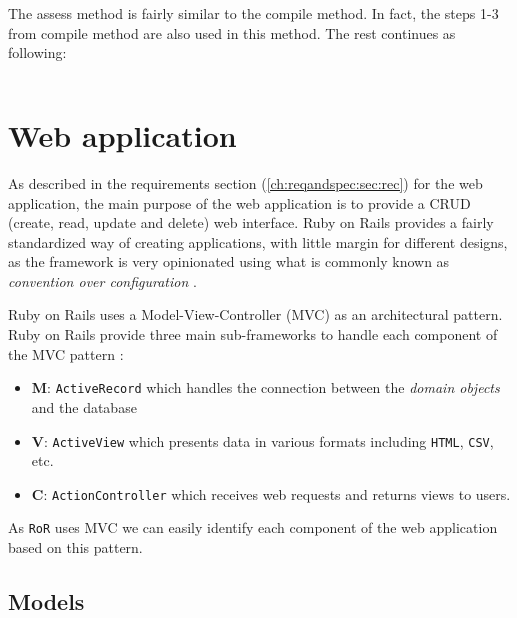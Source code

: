 The assess method is fairly similar to the compile method. In fact, the steps 1-3 from compile method are also used in this method. The rest continues as following:
\begin{tabularx}{\textwidth}{|c|Y|Y|}

\end{tabularx}

\section{Web application}


As described in the requirements section (\ref{ch:reqandspec:sec:rec}) for the web application, the main purpose of the web application is to provide a CRUD (create, read, update and delete) web interface. Ruby on Rails provides a fairly standardized way of creating applications, with little margin for different designs, as the framework is very opinionated using what is commonly known as \textit{convention over configuration} \citep{ruby_on_rails}.

Ruby on Rails uses a Model-View-Controller (MVC) as an architectural pattern. Ruby on Rails provide three main sub-frameworks to handle each component of the MVC pattern \citep{ruby_on_rails}:
\begin{itemize}
    \item \textbf{M}: \texttt{ActiveRecord} which handles the connection between the \textit{domain objects} and the database
    \item \textbf{V}: \texttt{ActiveView} which presents data in various formats including \texttt{HTML}, \texttt{CSV}, etc.
    \item \textbf{C}: \texttt{ActionController} which receives web requests and returns views to users.
\end{itemize}
As \texttt{RoR} uses MVC we can easily identify each component of the web application based on this pattern.

\subsection{Models}

